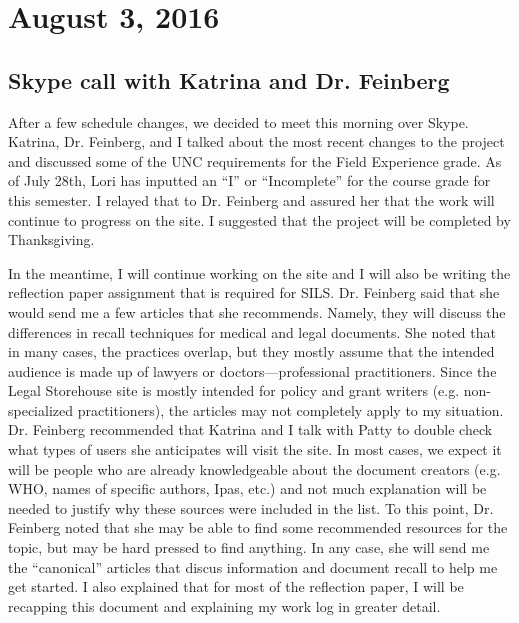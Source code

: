 \documentclass{article}
\begin{document}
\section{August 3, 2016}\label{2016-08-03}
\subsection{Skype call with Katrina and Dr. Feinberg}
After a few schedule changes, we decided to meet this morning over Skype. Katrina, Dr. Feinberg, and I talked about the most recent changes to the project and discussed some of the UNC requirements for the Field Experience grade. As of July 28th, Lori has inputted an ``I'' or ``Incomplete'' for the course grade for this semester. I relayed that to Dr. Feinberg and assured her that the work will continue to progress on the site. I suggested that the project will be completed by Thanksgiving.

In the meantime, I will continue working on the site and I will also be writing the reflection paper assignment that is required for SILS. Dr. Feinberg said that she would send me a few articles that she recommends. Namely, they will discuss the differences in recall techniques for medical and legal documents. She noted that in many cases, the practices overlap, but they mostly assume that the intended audience is made up of lawyers or doctors---professional practitioners. Since the Legal Storehouse site is mostly intended for policy and grant writers (e.g. non-specialized practitioners), the articles may not completely apply to my situation. Dr. Feinberg recommended that Katrina and I talk with Patty to double check what types of users she anticipates will visit the site. In most cases, we expect it will be people who are already knowledgeable about the document creators (e.g. WHO, names of specific authors, Ipas, etc.) and not much explanation will be needed to justify why these sources were included in the list. To this point, Dr. Feinberg noted that she may be able to find some recommended resources for the topic, but may be hard pressed to find anything. In any case, she will send me the ``canonical'' articles that discus information and document recall to help me get started. I also explained that for most of the reflection paper, I will be recapping this document and explaining my work log in greater detail.
\end{document}
